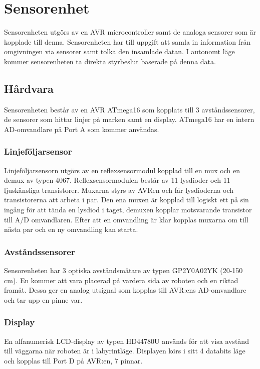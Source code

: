 \section{Sensorenhet}
Sensorenheten utgörs av en AVR microcontroller samt de analoga sensorer som är kopplade till denna. Sensorenheten har till uppgift att samla in information från omgivningen via sensorer samt tolka den insamlade datan. I autonomt läge kommer sensorenheten ta direkta styrbeslut baserade på denna data. 

\subsection{Hårdvara}
Sensorenheten består av en AVR ATmega16 som kopplats till 3 avståndssensorer, de sensorer som hittar linjer på marken samt en display. ATmega16 har en intern AD-omvandlare på Port A som kommer användas.

\subsubsection{Linjeföljarsensor}
Linjeföljarsensorn utgörs av en reflexsensormodul kopplad till en mux och en demux av typen 4067. Reflexsensormodulen består av 11 lysdioder och 11 ljuskänsliga transistorer. Muxarna styrs av AVRen och får lysdioderna och transistorerna att arbeta i par. Den ena muxen är kopplad till logiskt ett på sin ingång för att tända en lysdiod i taget, demuxen kopplar motsvarande transistor till A/D omvandlaren. Efter att en omvandling är klar kopplas muxarna om till nästa par och en ny omvandling kan starta.

\subsubsection{Avståndssensorer}
Sensorenheten har 3 optiska avståndsmätare av typen GP2Y0A02YK (20-150 cm). En kommer att vara placerad på vardera sida av roboten och en riktad framåt. Dessa ger en analog utsignal som kopplas till AVR:ens AD-omvandlare och tar upp en pinne var.

\subsubsection{Display}
En alfanumerisk LCD-display av typen HD44780U används för att visa avstånd till väggarna när roboten är i labyrintläge. Displayen körs i sitt 4 databits läge och kopplas till Port D på AVR:en, 7 pinnar.


